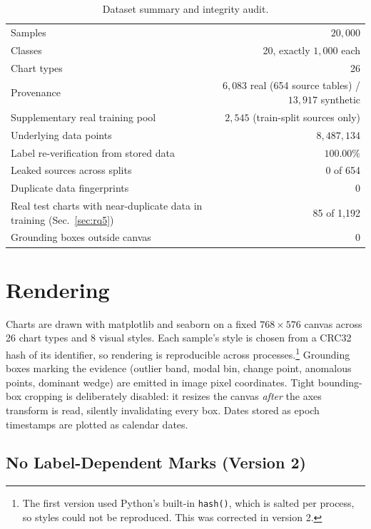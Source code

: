 \begin{table}[h]\centering\small
\caption{Dataset summary and integrity audit.}
\label{tab:dataset}
\begin{tabular}{lr}
\toprule
Samples & $20{,}000$ \\
Classes & 20, exactly $1{,}000$ each \\
Chart types & 26 \\
Provenance & $6{,}083$ real (654 source tables) / $13{,}917$ synthetic \\
Supplementary real training pool & $2{,}545$ (train-split sources only) \\
Underlying data points & $8{,}487{,}134$ \\
\midrule
Label re-verification from stored data & $100.00\%$ \\
Leaked sources across splits & 0 of 654 \\
Duplicate data fingerprints & 0 \\
Real test charts with near-duplicate data in training (Sec.~\ref{sec:rq5}) & 85 of 1{,}192 \\
Grounding boxes outside canvas & 0 \\
\bottomrule
\end{tabular}
\end{table}

\section{Rendering}
\label{sec:render}

Charts are drawn with matplotlib and seaborn on a fixed $768\times576$ canvas across
26 chart types and 8 visual styles. Each sample's style is chosen from a CRC32 hash of
its identifier, so rendering is reproducible across processes.\footnote{The first
version used Python's built-in \texttt{hash()}, which is salted per process, so styles
could not be reproduced. This was corrected in version 2.} Grounding boxes marking the
evidence (outlier band, modal bin, change point, anomalous points, dominant wedge) are
emitted in image pixel coordinates. Tight bounding-box cropping is deliberately
disabled: it resizes the canvas \emph{after} the axes transform is read, silently
invalidating every box. Dates stored as epoch timestamps are plotted as calendar dates.

\subsection{No Label-Dependent Marks (Version 2)}
\label{sec:v2}

